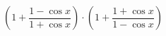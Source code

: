 \begin{ex}[type=expression]
	\begin{condition}
		\( \left(1+ \dfrac{1-\cos x}{1+\cos x} \right)\cdot\left( 1+ \dfrac{1+\cos x}{1-\cos x}\right) \)
	\end{condition}
\end{ex}